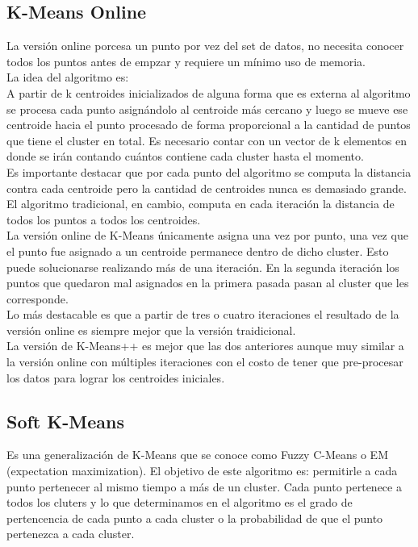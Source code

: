 \documentclass[titlepage,a4paper]{article}
\begin{document}
\subsection*{K-Means Online}
La versión online porcesa un punto por vez del set de datos, no necesita conocer todos los puntos antes de empzar y requiere un mínimo uso de memoria. \\

La idea del algoritmo es: \\

A partir de k centroides inicializados de alguna forma que es externa al algoritmo se procesa cada punto asignándolo al centroide más cercano y luego se mueve ese centroide hacia el punto procesado de forma proporcional  a la cantidad de puntos que tiene el cluster en total. Es necesario contar con un vector de k elementos en donde se irán contando cuántos contiene cada cluster hasta el momento. \\

Es importante destacar que por cada punto del algoritmo se computa la distancia contra cada centroide pero la cantidad de centroides nunca es demasiado grande. El algoritmo tradicional, en cambio, computa en cada iteración la distancia de todos los puntos a todos los centroides. \\

La versión online de K-Means únicamente asigna una vez por punto, una vez que el punto fue asignado a un centroide permanece dentro de dicho cluster. Esto puede solucionarse realizando más de una iteración. En la segunda iteración los puntos que quedaron mal asignados en la primera pasada pasan al cluster que les corresponde. \\

Lo más destacable es que a partir de tres o cuatro iteraciones el resultado de la versión online es siempre mejor que la versión traidicional. \\ 

La versión de K-Means++ es mejor que las dos anteriores aunque muy similar a la versión online con múltiples iteraciones con el costo de tener que pre-procesar los datos para lograr los centroides iniciales. 

\subsection*{Soft K-Means}
Es una generalización de K-Means que se conoce como Fuzzy C-Means o EM (expectation maximization). El objetivo de este algoritmo es: permitirle a cada punto pertenecer al mismo tiempo a más de un cluster. Cada punto pertenece a todos los cluters y lo que determinamos en el algoritmo es el grado de pertencencia de cada punto a cada cluster o la probabilidad de que el punto pertenezca a cada cluster. \\
\end{document}
